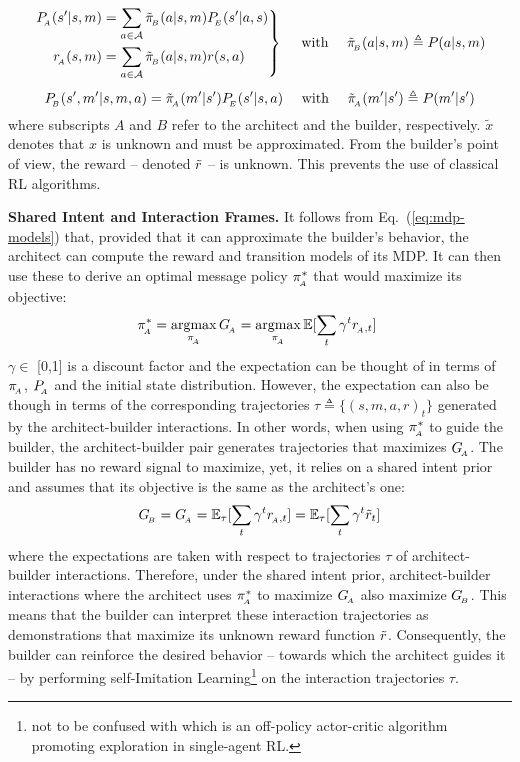 \begin{equation}
\label{eq:mdp-models}
\left.\begin{split}
    P_{\!_A}(s'|s,m) &= \sum_{a\in{\mathcal{A}}} \tilde{\pi}_{\!_B}(a|s,m) P_{\!_E}(s'|a,s) \\ 
    r_{\!_A}(s,m) &= \sum_{a\in{\mathcal{A}}}\tilde{\pi}_{\!_B}(a|s,m)r(s,a) 
\end{split}\right\} \quad \text{ with } \quad \tilde{\pi}_{\!_B}(a|s,m) \triangleq P(a|s,m)
\end{equation}
\begin{equation}
\label{eq:mdp-models2}
P_{\!_B}(s',m'|s,m,a)= \tilde{\pi}_{\!_A}(m'|s') P_{\!_E}(s'|s,a) \quad \text{ with } \quad \tilde{\pi}_{\!_A}(m'|s') \triangleq P(m'|s')
\end{equation}
where subscripts $A$ and $B$ refer to the architect and the builder, respectively. $\tilde{x}$ denotes that $x$ is unknown and must be approximated. From the builder's point of view, the reward -- denoted $\tilde{r}$ -- is unknown. This prevents the use of classical RL algorithms.

\textbf{Shared Intent and Interaction Frames. } 
It follows from Eq.~(\ref{eq:mdp-models}) that, provided that it can approximate the builder's behavior, the architect can compute the reward and transition models of its MDP. It can then use these to derive an optimal message policy $\pi_{\!_A}^*$ that would maximize its objective:
\begin{equation}
\pi_{\!_A}^* = \operatorname*{argmax}_{\pi_{\!_A}}G_{\!_A} = \operatorname*{argmax}_{\pi_{\!_A}}\mathbb{E}[\sum_t \gamma^t r_{\!_A ,t}]\
\label{eq:pistar}
\end{equation}
$\gamma \in$ [0,1] is a discount factor and the expectation can be thought of in terms of $\pi_{\!_A}$, $P_{\!_A}$ and the initial state distribution. However, the expectation can also be though in terms of the corresponding trajectories $\tau \triangleq \{(s,m,a,r)_t\}$ generated by the architect-builder interactions. In other words, when using $\pi_{\!_A}^*$ to guide the builder, the architect-builder pair generates trajectories that maximizes $G_{\!_A}$.  The builder has no reward signal to maximize, yet, it relies on a shared intent prior and assumes that its objective is the same as the architect's one:
\begin{equation}
   G_{\!_B} = G_{\!_A} = \mathbb{E}_\tau[\sum_t \gamma^t r_{\!_A ,t}] = \mathbb{E}_\tau[\sum_t \gamma^t \tilde{r}_{t}] 
\end{equation}
where the expectations are taken with respect to trajectories $\tau$ of architect-builder interactions. Therefore, under the shared intent prior, architect-builder interactions where the architect uses $\pi_{\!_A}^*$ to maximize $G_{\!_A}$ also maximize $G_{\!_B}$. This means that the builder can interpret these interaction trajectories as demonstrations that maximize its unknown reward function $\tilde{r}$. Consequently, the builder can reinforce the desired behavior -- towards which the architect guides it -- by performing self-Imitation Learning\footnote{not to be confused with \cite{Oh2018SIL} which is an off-policy actor-critic algorithm promoting exploration in single-agent RL. } on the interaction trajectories $\tau$. 

